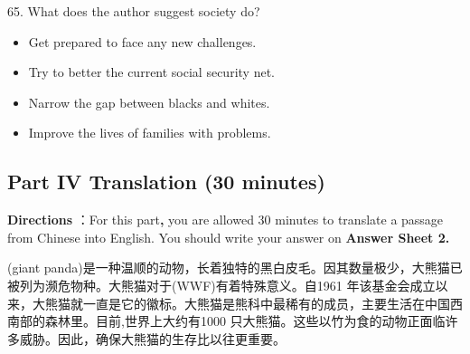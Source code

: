 \documentclass[UTF8,11pt]{ctexart}
\begin{document}
65. What does the author suggest society do?


\begin{itemize}[leftmargin=2em,itemsep=.2em,topsep=.4em]\item[A.] Get prepared to face any new challenges.
\item[B.] Try to better the current social security net.
\item[C.] Narrow the gap between blacks and whites.
\item[D.] Improve the lives of families with problems.
\end{itemize}

\subsection*{Part IV Translation (30 minutes)}


\textbf{Directions} ：For this part\textbf{,} you are allowed 30 minutes to translate a passage from Chinese into English. You should write your answer on\textbf{ Answer Sheet 2.}


(giant panda)是一种温顺的动物，长着独特的黑白皮毛。因其数量极少，大熊猫已被列为濒危物种。大熊猫对于(WWF)有着特殊意义。自1961 年该基金会成立以来，大熊猫就一直是它的徽标。大熊猫是熊科中最稀有的成员，主要生活在中国西南部的森林里。目前,世界上大约有1000 只大熊猫。这些以竹为食的动物正面临许多威胁。因此，确保大熊猫的生存比以往更重要。
\end{document}
